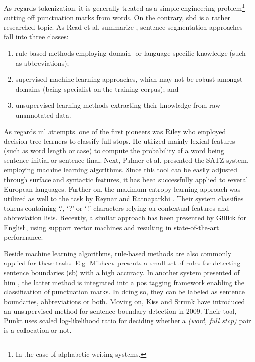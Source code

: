 As regards tokenization, it is generally treated as a simple engineering problem\footnote{In the case of alphabetic writing systems.} cutting off punctuation marks from words. 
On the contrary, \acrshort{sbd} is a rather researched topic. 
As Read et al. summarize \cite{read2012sentence}, sentence segmentation approaches fall into three classes: 
\begin{enumerate}
 \item rule-based methods employing domain- or language-specific knowledge (such as abbreviations); 
 \item supervised machine learning approaches, which may not be robust amongst domains (being specialist on the training corpus); and
 \item unsupervised learning methods extracting their knowledge from raw unannotated data. 
\end{enumerate}

As regards \acrshort{ml} attempts, one of the first pioneers was Riley \cite{riley1989some} who employed decision-tree learners to classify full stops. 
He utilized mainly lexical features (such as word length or case) to compute the probability of a word being sentence-initial or sentence-final. 
Next, Palmer et al. presented \cite{palmer1997adaptive} the SATZ system, employing machine learning algorithms. 
Since this tool can be easily adjusted through surface and syntactic features, it has been successfully applied to several European languages. 
Further on, the maximum entropy learning approach was utilized as well to the task by Reynar and Ratnaparkhi \cite{reynar1997maximum}. 
Their system classifies tokens containing `.', `?' or `!' characters relying on contextual features and abbreviation lists. 
Recently, a similar approach has been presented by Gillick \cite{gillick2009sentence} for English, using support vector machines and resulting in state-of-the-art performance.

Beside machine learning algorithms, rule-based methods are also commonly applied for these tasks. 
E.g. Mikheev presents \cite{mikheev2002periods} a small set of rules for detecting sentence boundaries (\acrshort{sb}) with a high accuracy. 
In another system presented of him \cite{mikheev2000tagging}, the latter method is integrated into a \acrshort{pos} tagging framework enabling the classification of punctuation marks. 
In doing so, they can be labeled as sentence boundaries, abbreviations or both. 
Moving on, Kiss and Strunk have introduced \cite{kiss2006unsupervised} an unsupervised method for sentence boundary detection in 2009. 
Their tool, Punkt uses scaled log-likelihood ratio for deciding whether a \emph{(word, full stop)} pair is a collocation or not.

